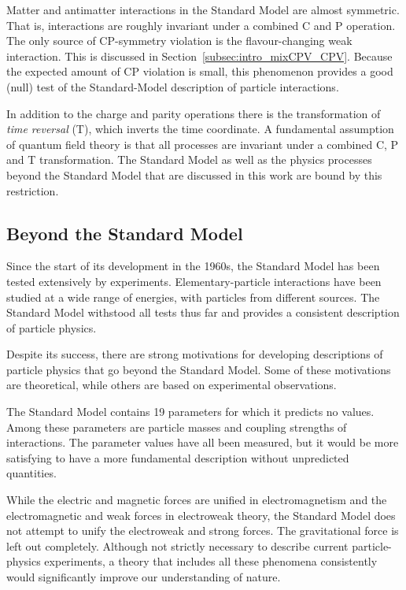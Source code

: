 Matter and antimatter interactions in the Standard Model are almost symmetric. That is, interactions are roughly invariant under a
combined C and P operation. The only source of CP-symmetry violation is the flavour-changing weak interaction. This is discussed in
Section~\ref{subsec:intro_mixCPV_CPV}. Because the expected amount of CP violation is small, this phenomenon provides a good (null) test of
the Standard-Model description of particle interactions.

In addition to the charge and parity operations there is the transformation of \emph{time reversal} (T), which inverts the time coordinate.
A fundamental assumption of quantum field theory is that all processes are invariant under a combined C, P and T transformation. The
Standard Model as well as the physics processes beyond the Standard Model that are discussed in this work are bound by this restriction.


\subsection{Beyond the Standard Model}
\label{subsec:intro_SM_beyond}

Since the start of its development in the 1960s, the Standard Model has been tested extensively by experiments. Elementary-particle
interactions have been studied at a wide range of energies, with particles from different sources. The Standard Model withstood all tests
thus far and provides a consistent description of particle physics.

Despite its success, there are strong motivations for developing descriptions of particle physics that go beyond the Standard Model. Some
of these motivations are theoretical, while others are based on experimental observations.

The Standard Model contains 19 parameters for which it predicts no values. Among these parameters are particle masses and coupling
strengths of interactions. The parameter values have all been measured, but it would be more satisfying to have a more fundamental
description without unpredicted quantities.

While the electric and magnetic forces are unified in electromagnetism and the electromagnetic and weak forces in electroweak theory, the
Standard Model does not attempt to unify the electroweak and strong forces. The gravitational force is left out completely. Although not
strictly necessary to describe current particle-physics experiments, a theory that includes all these phenomena consistently would
significantly improve our understanding of nature.

